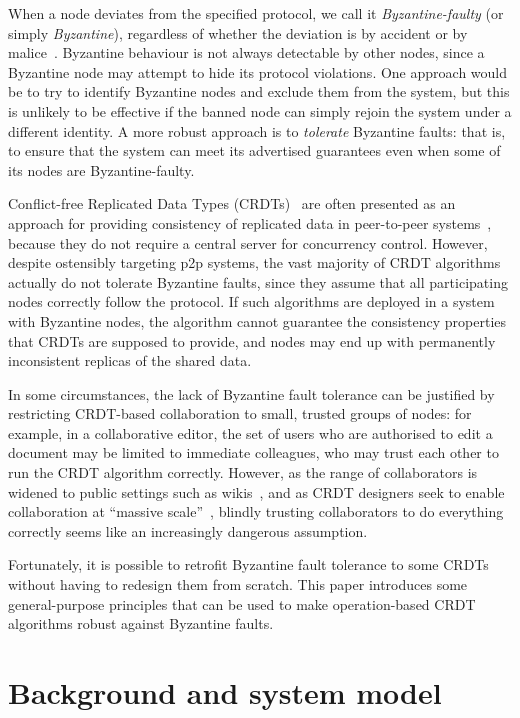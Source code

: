 \documentclass[sigplan,review]{acmart}
\begin{document}
When a node deviates from the specified protocol, we call it \emph{Byzantine-faulty} (or simply \emph{Byzantine}), regardless of whether the deviation is by accident or by malice~\cite{Lamport:1982}.
Byzantine behaviour is not always detectable by other nodes, since a Byzantine node may attempt to hide its protocol violations.
One approach would be to try to identify Byzantine nodes and exclude them from the system, but this is unlikely to be effective if the banned node can simply rejoin the system under a different identity.
A more robust approach is to \emph{tolerate} Byzantine faults: that is, to ensure that the system can meet its advertised guarantees even when some of its nodes are Byzantine-faulty.

Conflict-free Replicated Data Types (CRDTs)~\cite{Shapiro:2011} are often presented as an approach for providing consistency of replicated data in peer-to-peer systems~\cite{vanderLinde:2017fu,Weiss:2009ht,Nicolaescu:2016}, because they do not require a central server for concurrency control.
However, despite ostensibly targeting p2p systems, the vast majority of CRDT algorithms actually do not tolerate Byzantine faults, since they assume that all participating nodes correctly follow the protocol.
If such algorithms are deployed in a system with Byzantine nodes, the algorithm cannot guarantee the consistency properties that CRDTs are supposed to provide, and nodes may end up with permanently inconsistent replicas of the shared data.

In some circumstances, the lack of Byzantine fault tolerance can be justified by restricting CRDT-based collaboration to small, trusted groups of nodes: for example, in a collaborative editor, the set of users who are authorised to edit a document may be limited to immediate colleagues, who may trust each other to run the CRDT algorithm correctly.
However, as the range of collaborators is widened to public settings such as wikis~\cite{Nedelec:2016eo,Weiss:2007,Weiss:2009ht}, and as CRDT designers seek to enable collaboration at ``massive scale''~\cite{Andre:2013,Weiss:2009ht,Lv:2016}, blindly trusting collaborators to do everything correctly seems like an increasingly dangerous assumption.

Fortunately, it is possible to retrofit Byzantine fault tolerance to some CRDTs without having to redesign them from scratch.
This paper introduces some general-purpose principles that can be used to make operation-based CRDT algorithms robust against Byzantine faults.

\section{Background and system model}
\end{document}
